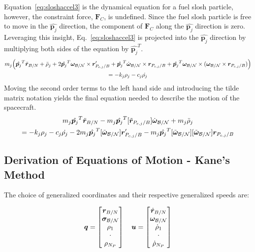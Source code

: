Equation~\eqref{eq:sloshaccel3} is the dynamical equation for a fuel slosh particle, however, the constraint force, $\bm F_C$, is undefined. Since the fuel slosh particle is free to move in the $\hat{\bm p_j}$ direction, the component of $\bm F_C$ along the $\hat{\bm p_j}$ direction is zero. Leveraging this insight, Eq.~\eqref{eq:sloshaccel3} is projected into the $\hat{\bm p_j}$ direction by multiplying both sides of the equation by $\hat{\bm p_j}^T$.
\begin{multline}
	m_j \Bigl(\hat{\bm p_j}^T \ddot{\bm{r}}_{B/N} + \ddot{\rho}_j  +2 \hat{\bm p_j}^T  \bm\omega_{\cal B/N} \times \bm{r}'_{P_{c,j}/B} + \hat{\bm p_j}^T \dot{\bm\omega}_{\cal B/N} \times \bm{r}_{P_{c,j}/B}  + \hat{\bm p_j}^T \bm\omega_{\cal B/N} \times (\bm\omega_{\cal B/N} \times \bm{r}_{P_{c,j}/B})\Bigr)\\
	= - k_j \rho_j - c_j \dot{\rho_j}
	\label{eq:sloshaccel4}
\end{multline}	
Moving the second order terms to the left hand side and introducing the tilde matrix notation yields the final equation needed to describe the motion of the spacecraft.
\begin{multline}
	m_j \hat{\bm p_j}^T \ddot{\bm{r}}_{B/N} - m_j \hat{\bm p_j}^T [\tilde{\bm{r}}_{P_{c,j}/B}] \dot{\bm\omega}_{\cal B/N} + m_j \ddot{\rho}_j  \\
	= - k_j \rho_j - c_j \dot{\rho_j} - 2 m_j \hat{\bm p_j}^T  [\tilde{\bm\omega}_{\cal B/N}] \bm{r}'_{P_{c,j}/B}  - m_j \hat{\bm p_j}^T [\tilde{\bm\omega}_{\cal B/N}] [\tilde{\bm\omega}_{\cal B/N}] \bm{r}_{P_{c,j}/B} 
	\label{eq:sloshaccel5}
\end{multline}	

\subsection{Derivation of Equations of Motion - Kane's Method}

The choice of generalized coordinates and their respective generalized speeds are:

\begin{equation}
	\bm q = 
	\begin{bmatrix}
		\bm r_{B/N}\\
		\bm \sigma_{\cal{B/N}}\\
		\rho_1\\
		\cdot\\
		\rho_{N_P}
	\end{bmatrix}
	\quad
	\bm u = \begin{bmatrix}
		\dot{\bm r}_{B/N}\\
		\bm \omega_{\cal{B/N}}\\
		\dot{\rho}_1\\
		\cdot\\
		\dot{\rho}_{N_P}
	\end{bmatrix}
\end{equation} 

